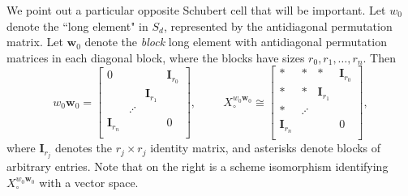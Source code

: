 \documentclass[reqno]{amsart}
\numberwithin{equation}{section}
\theoremstyle{definition}
\theoremstyle{remark}
\begin{document}
We point out a particular opposite Schubert cell that will be important.
Let $w_0$ denote the ``long element" in $S_d$, represented by the antidiagonal permutation matrix. Let $\mathbf{w}_0$ denote the \textit{block} long element with antidiagonal permutation matrices in each diagonal block, where the blocks have sizes $r_0,r_1,\dots,r_n$. Then
\[w_0\mathbf{w}_0=\begin{bmatrix} 0&&&\mathbf{I}_{r_0}\\&&\mathbf{I}_{r_1}&\\&\iddots&&\\\mathbf{I}_{r_n}&&&0\\ \end{bmatrix}, \hspace{1cm} X_\circ^{w_0 \mathbf{w}_0} \cong 
\begin{bmatrix} 
*&*&*&\mathbf{I}_{r_0}\\
*&*&\mathbf{I}_{r_1}&\\
*&\iddots&&\\
\mathbf{I}_{r_n}&&&0\\ \end{bmatrix},\]
where $\mathbf{I}_{r_j}$ denotes the $r_j \times r_j$ identity matrix, and asterisks denote blocks of arbitrary entries.
Note that on the right is a scheme isomorphism identifying $X_\circ^{w_0\mathbf{w}_0}$ with a vector space.
\end{document}
